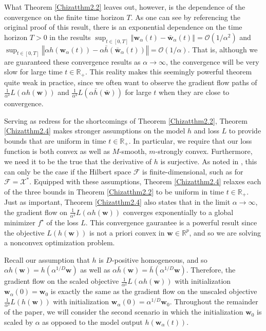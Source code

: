 \documentclass{article}
\begin{document}
What Theorem \ref{Chizatthm2.2} leaves out, however, is the dependence of the convergence on the finite time horizon $T$. As one can see by referencing the original proof of this result, there is an exponential dependence on the time horizon $T>0$ in the results $\sup_{t \in [0, T]} \left\Vert \boldsymbol{w}_{\alpha}(t) - \boldsymbol{\bar{w}}_{\alpha}(t) \right\Vert = \mathcal{O}(1/\alpha^2)$ and $\sup_{t \in [0, T]} \left\Vert \alpha h(\boldsymbol{w}_{\alpha}(t)) - \alpha \bar{h}(\boldsymbol{\bar{w}}_{\alpha}(t)) \right\Vert = \mathcal{O}(1/\alpha)$. That is, although we are guaranteed these convergence results as $\alpha \rightarrow \infty$, the convergence will be very slow for large time $t \in \mathbb{R}_+$. This reality makes this seemingly powerful theorem quite weak in practice, since we often want to observe the gradient flow paths of $\frac{1}{\alpha^2}L(\alpha h(\boldsymbol{w}))$ and $\frac{1}{\alpha^2}L(\alpha \bar{h}(\boldsymbol{\bar{w}}))$ for large $t$ when they are close to convergence.

Serving as redress for the shortcomings of Theorem \ref{Chizatthm2.2}, Theorem \ref{Chizatthm2.4} makes stronger assumptions on the model $h$ and loss $L$ to provide bounds that are uniform in time $t \in \mathbb{R}_+$. In particular, we require that our loss function is both convex as well as $M$-smooth, $m$-strongly convex. Furthermore, we need it to be the true that the derivative of $h$ is surjective. As noted in \cite{chizat2018lazy}, this can only be the case if the Hilbert space $\mathcal{F}$ is finite-dimensional, such as for $\mathcal{F} = \mathcal{X}^*$. Equipped with these assumptions, Theorem \ref{Chizatthm2.4} relaxes each of the three bounds in Theorem \ref{Chizatthm2.2} to be uniform in time $t \in \mathbb{R}_+$. Just as important, Theorem \ref{Chizatthm2.4} also states that in the limit $\alpha \rightarrow \infty$, the gradient flow on $\frac{1}{\alpha^2}L(\alpha h(\boldsymbol{w}))$ converges exponentially to a global minimizer $f^{\star}$ of the loss $L$. This convergence gaurantee is a powerful result since the objective $L(h(\boldsymbol{w}))$ is not a priori convex in $\boldsymbol{w} \in \mathbb{R}^p$, and so we are solving a nonconvex optimization problem.

Recall our assumption that $h$ is $D$-positive homogeneous, and so $\alpha h(\boldsymbol{w}) = h(\alpha^{1/D}\boldsymbol{w})$ as well as $\alpha \bar{h}(\boldsymbol{w}) = \bar{h}(\alpha^{1/D}\boldsymbol{w})$.
Therefore, the gradient flow on the scaled objective $\frac{1}{\alpha^2}L(\alpha h(\boldsymbol{w}))$ with initialization $\boldsymbol{w}_{\alpha}(0) = \boldsymbol{w}_0$ is exactly the same as the gradient flow on the unscaled objective $\frac{1}{\alpha^2}L(h(\boldsymbol{w}))$ with initialization $\boldsymbol{w}_{\alpha}(0) = \alpha^{1/D}\boldsymbol{w}_0$. Throughout the remainder of the paper, we will consider the second scenario in which the initialization $\boldsymbol{w}_0$ is scaled by $\alpha$ as opposed to the model output $h(\boldsymbol{w}_{\alpha}(t))$. 
\end{document}
